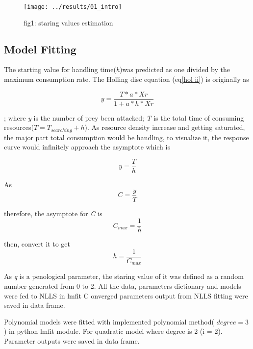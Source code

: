 \documentclass[11pt, a4paper]{article}
\begin{document}
\begin{figure}\label{fig1}
	\centering
	\texttt{[image: ../results/01\_intro]}
	\caption{fig1: staring values estimation}
	\label{staring values selection}
\end{figure}
\subsection{Model Fitting}
\vspace{0.1\baselineskip}
The starting value for handling time(\textit{h})was predicted as one divided by the maximum consumption rate. The Holling disc equation (eq\ref{hol ii}) is originally as 

\begin{equation}\label{hol disc}
y = \frac{T *a *Xr }{1+a*h*Xr}
\end{equation}

; where \textit{y} is the number of prey been attacked; \textit{T} is the total time of consuming resources($T = T_{searching} + h$). As resource density increase and getting saturated, the major part total consumption would be handling, to visualize it, the response curve would infinitely approach the asymptote which is 

\begin{equation}\label{est h}
y = \frac{T}{h}
\end{equation}

As  
\begin{equation}\label{con rate}
C = \frac{y}{T}
\end{equation}

 therefore, the asymptote for \textit{C} is
  \begin{equation}\label{key}
  C_{max}= \frac{1}{h}
  \end{equation}
  
   then, convert it to get 
   \begin{equation}\label{key}
   h = \frac{1}{C_{max}}
   \end{equation}

As \textit{q} is a penological parameter, the staring value of it was defined as a random number generated from 0 to 2. All the data, parameters dictionary and models were fed to NLLS in lmfit 
C
onverged parameters output from NLLS fitting were saved in data frame.
 
Polynomial models were fitted with implemented polynomial method( $degree = 3$) in python lmfit module. For quadratic model where degree is 2 (i = 2). Parameter outputs were saved in data frame.
\end{document}
